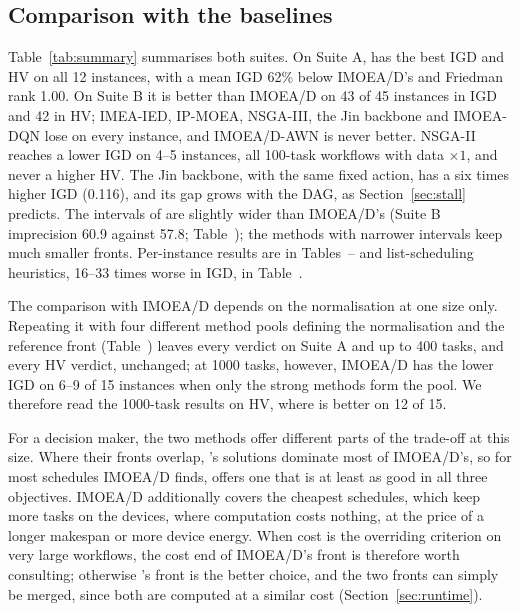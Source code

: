 

\subsection{Comparison with the baselines}
\label{sec:results}
Table~\ref{tab:summary} summarises both suites. On Suite A, \ours{} has the best IGD and HV on all 12 instances, with a
mean IGD 62\% below IMOEA/D's and Friedman rank 1.00. On Suite B it is better than IMOEA/D on 43 of 45 instances in IGD
and 42 in HV; IMEA-IED, IP-MOEA, NSGA-III, the Jin backbone and IMOEA-DQN lose on every instance, and IMOEA/D-AWN is never
better. NSGA-II reaches a lower IGD on 4--5 instances, all 100-task workflows with data $\times 1$, and never a higher HV.
The Jin backbone, with the same fixed action, has a six times higher IGD (0.116), and its gap grows with the DAG, as
Section~\ref{sec:stall} predicts. The intervals of \ours{} are slightly wider than IMOEA/D's (Suite B imprecision 60.9
against 57.8; Table~); the methods with narrower intervals keep much smaller fronts.
Per-instance results are in Tables~-- and list-scheduling heuristics,
16--33 times worse in IGD, in Table~.

The comparison with IMOEA/D depends on the normalisation at one size only. Repeating it with four different method
pools defining the normalisation and the reference front (Table~) leaves every verdict on Suite A
and up to 400 tasks, and every HV verdict, unchanged; at 1000 tasks, however, IMOEA/D has the lower IGD on 6--9 of 15
instances when only the strong methods form the pool. We therefore read the 1000-task results on HV, where \ours{} is
better on 12 of 15.

For a decision maker, the two methods offer different parts of the trade-off at this size. Where their fronts overlap,
\ours{}'s solutions dominate most of IMOEA/D's, so for most schedules IMOEA/D finds, \ours{} offers one that is at least
as good in all three objectives. IMOEA/D additionally covers the cheapest schedules, which keep more tasks on the devices,
where computation costs nothing, at the price of a longer makespan or more device energy. When cost is the overriding
criterion on very large
workflows, the cost end of IMOEA/D's front is therefore worth consulting; otherwise \ours{}'s front is the better
choice, and the two fronts can simply be merged, since both are computed at a similar cost (Section~\ref{sec:runtime}).

